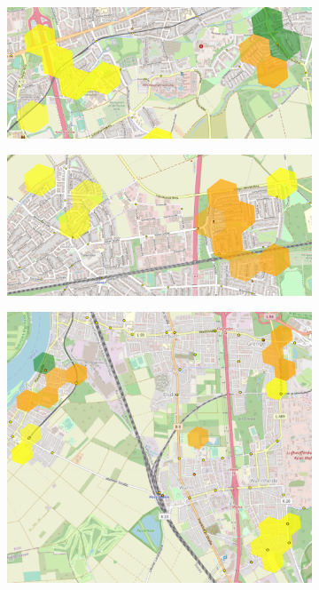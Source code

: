 \begin{figure}
     \centering
     \begin{subfigure}[b]{0.45\textwidth}
         \centering
         \includegraphics[width=\textwidth]{Figures/results/problematic_hexagons/example_1.png}
     \end{subfigure}
     \hfill
     \begin{subfigure}[b]{0.45\textwidth}
         \centering
         \includegraphics[width=\textwidth]{Figures/results/problematic_hexagons/example_2.png}
     \end{subfigure}
     \hfill
     \begin{subfigure}[b]{0.45\textwidth}
         \centering
         \includegraphics[width=\textwidth]{Figures/results/problematic_hexagons/example_3.png}

\end{subfigure}
\end{figure}
